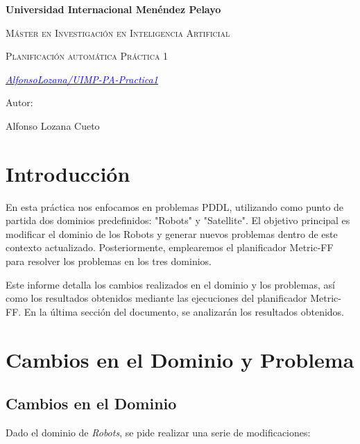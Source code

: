 \documentclass{article}
\begin{document}
\begin{titlepage}
    \centering
    {\bfseries\LARGE Universidad Internacional Menéndez Pelayo  \par}
    \vspace{1cm}
    {\scshape\Large Máster en Investigación en Inteligencia Artificial    \par}
    \vspace{3cm}
    {\scshape\Huge Planificación automática Práctica 1 \par}
    \vspace{3cm}
    {\itshape\Large \href{https://github.com/AlfonsoLozana/UIMP-PA-Practica1}{\textcolor{blue}{AlfonsoLozana/UIMP-PA-Practica1}} \par} %
    \vfill
    {\Large Autor: \par}
    {\Large Alfonso Lozana Cueto \par}
    \vfill
\end{titlepage}

\section{Introducción}
En esta práctica nos enfocamos en problemas PDDL, utilizando como punto de partida dos dominios predefinidos: "Robots" y "Satellite".
El objetivo principal es modificar el dominio de los Robots y generar nuevos problemas dentro de este contexto actualizado. 
Posteriormente, emplearemos el planificador Metric-FF para resolver los problemas en los tres dominios.

Este informe detalla los cambios realizados en el dominio y los problemas, así como los resultados obtenidos mediante las ejecuciones 
del planificador Metric-FF. En la última sección del documento, se analizarán los resultados obtenidos.

 \section{Cambios en el Dominio y Problema}

 \subsection{Cambios en el Dominio}
 Dado el dominio de \textit{Robots}, se pide realizar una serie de modificaciones:
\end{document}
